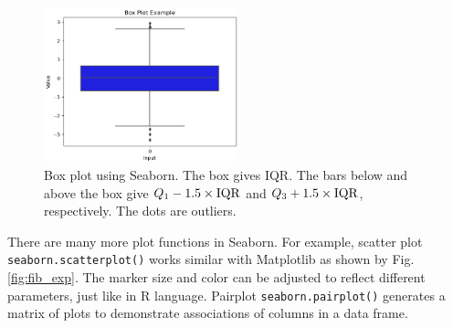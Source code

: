 \begin{figure}[htbp]
	\centering
	\includegraphics[width=0.5\textwidth]{./chapters/ch-python/figures/boxplotexp.png}
	\caption{Box plot using Seaborn. The box gives IQR. The bars below and above the box give $Q_1-1.5\times\textup{IQR}$ and $Q_3+1.5\times\textup{IQR}$, respectively. The dots are outliers.}
	\label{fig:boxplot}
\end{figure}

There are many more plot functions in Seaborn. For example, scatter plot \verb|seaborn.scatterplot()| works similar with Matplotlib as shown by Fig. \ref{fig:fib_exp}. The marker size and color can be adjusted to reflect different parameters, just like in R language. Pairplot \verb|seaborn.pairplot()| generates a matrix of plots to demonstrate associations of columns in a data frame.
